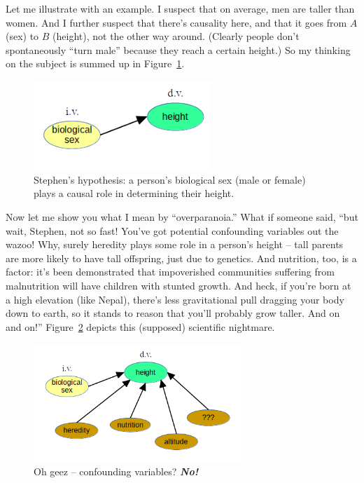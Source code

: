 Let me illustrate with an example. I suspect that on average, men are taller
than women. And I further suspect that there's causality here, and that it goes
from $A$ (sex) to $B$ (height), not the other way around. (Clearly people don't
spontaneously ``turn male'' because they reach a certain height.) So my
thinking on the subject is summed up in Figure~\ref{fig:sexHeight}.

\begin{figure}[ht]
\centering
\includegraphics[width=0.6\textwidth]{sexHeight.png}
\caption{Stephen's hypothesis: a person's biological sex (male or female) plays
a causal role in determining their height.}
\label{fig:sexHeight}
\end{figure}

Now let me show you what I mean by ``overparanoia.'' What if someone said,
``but wait, Stephen, not so fast! You've got potential confounding variables
out the wazoo! Why, surely heredity plays some role in a person's height --
tall parents are more likely to have tall offspring, just due to genetics. And
nutrition, too, is a factor: it's been demonstrated that impoverished
communities suffering from malnutrition will have children with stunted growth.
And heck, if you're born at a high elevation (like Nepal), there's less
gravitational pull dragging your body down to earth, so it stands to reason
that you'll probably grow taller. And on and on!'' Figure~\ref{fig:sexHeight2}
depicts this (supposed) scientific nightmare.

\begin{figure}[ht]
\centering
\includegraphics[width=0.7\textwidth]{sexHeight2.png}
\caption{Oh geez -- confounding variables? \textbf{\textit{No!}}}
\label{fig:sexHeight2}
\end{figure}

